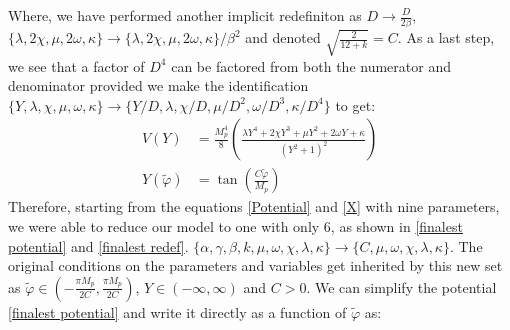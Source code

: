 \documentclass[aps,prd,reprint,preprintnumbers,showpacs,floatfix,nofootinbib,superscript address]{revtex4-2}
\begin{document}
Where, we have performed another implicit redefiniton as $D \rightarrow \frac{D}{2\beta}$, $ \{\lambda, 2\chi, \mu, 2\omega,  \kappa \} \rightarrow \{\lambda, 2\chi, \mu, 2\omega,  \kappa \} /\beta^2$ and denoted $\sqrt{\frac{2}{12+k}} = C$. As a last step, we see that a factor of $D^4$ can be factored from both the numerator and denominator provided we make the identification $\{Y, \lambda, \chi, \mu, \omega, \kappa \} \rightarrow \{Y/D, \lambda, \chi/D, \mu/D^2, \omega/D^3, \kappa/D^4 \}$ to get:
\begin{align}
    V(Y) &=  \frac{M_p^4}{8}  \left(\frac{\lambda Y^4 + 2 \chi Y^3 + \mu Y^2  + 2\omega Y + \kappa}{(Y^2 + 1)^2} \right) \label{finalest potential} \\
    Y(\tilde{\varphi}) &=  \tan \left(\frac{C \tilde{\varphi}}{M_p} \right) \label{finalest redef}
\end{align}
Therefore, starting from the equations \cref{Potential} and \cref{X} with nine parameters, we were able to reduce our model to one with only 6, as shown in \cref{finalest potential} and \cref{finalest redef}. $\{\alpha, \gamma,\beta, k , \mu, \omega, \chi, \lambda, \kappa\} \rightarrow \{C , \mu, \omega, \chi, \lambda, \kappa\}$. The original conditions on the parameters and variables get inherited by this new set as $\tilde{\varphi} \in (-\frac{\pi M_p}{2C},\frac{\pi M_p}{2C})$, $Y \in (-\infty,\infty)$ and $C > 0$. We can simplify the potential \cref{finalest potential} and write it directly as a function of $\tilde{\varphi}$ as:
\end{document}
